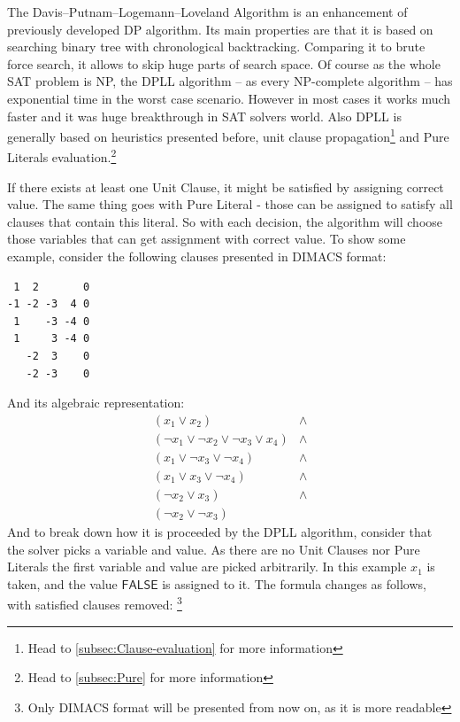 \documentclass[12pt,english,pdflatex]{aghdpl}
\begin{document}
The Davis–Putnam–Logemann–Loveland Algorithm \cite{Biere:2009} is an enhancement of previously
developed DP algorithm. Its main properties are that it is based
on searching binary tree with chronological backtracking. Comparing
it to brute force search, it allows to skip huge parts of search
space. Of course as the whole SAT problem is NP, the DPLL algorithm -- as every
NP-complete algorithm -- has exponential time in the worst case
scenario. However in most cases it works much faster and it was huge
breakthrough in SAT solvers world. Also DPLL is generally based on
heuristics presented before, unit clause propagation\footnote{Head to \ref{subsec:Clause-evaluation} for more information} and Pure
Literals evaluation.\footnote{Head to \ref{subsec:Pure} for more information}

If there exists at least one Unit Clause, it might
be satisfied by assigning correct value. The same thing goes with Pure
Literal - those can be assigned to satisfy all clauses that contain
this literal. So with each decision, the algorithm will choose those variables
that can get assignment with correct value. To show some example,
consider the following clauses presented in DIMACS format:

\begin{lstlisting}
 1  2       0
-1 -2 -3  4 0
 1    -3 -4 0
 1     3 -4 0
   -2  3    0
   -2 -3    0
\end{lstlisting}
And its algebraic representation:
\begin{equation}
\label{equ:algver1}
\begin{array}{lc}
(x_{1}\vee x_{2})          & \wedge  \\
(\neg x_1\vee \neg x_{2}\vee \neg x_{3}\vee x_{4}) & \wedge \\
(x_{1}\vee \neg x_{3}\vee \neg x_4)          & \wedge \\
(x_{1}\vee x_{3}\vee \neg x_4)          & \wedge \\
(\neg x_{2}\vee x_{3})          & \wedge \\
(\neg x_{2}\vee \neg x_{3})
\end{array}
\end{equation}
And to break down how it is proceeded by the DPLL algorithm, consider that the  solver
picks a variable and value. As there are no Unit Clauses nor Pure
Literals the first variable and value are picked arbitrarily. In this example
$x_1$ is taken, and the value $\mathsf{FALSE}$ is assigned to it.
The formula changes as follows, with satisfied clauses removed: \footnote{Only DIMACS format
will be presented from now on, as it is more readable}
\end{document}
